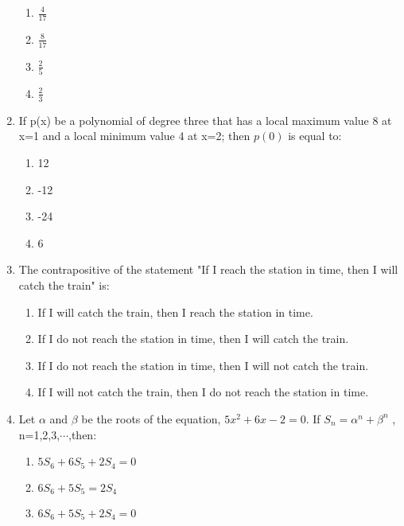 \documentclass[journal]{IEEEtran}
\numberwithin{equation}{enumi}
\numberwithin{figure}{enumi}
\begin{document}
\begin{enumerate}
    \begin{multicols}{4}
    \begin{enumerate}
        \item $\frac{4}{17}$
        \item $\frac{8}{17}$
        \item $\frac{2}{5}$
        \item $\frac{2}{3}$
    \end{enumerate} 
    \end{multicols}
    \item If p(x) be a polynomial of degree three that has a local maximum value 8 at x=1 and a local minimum value 4 at x=2; then $p(0)$ is equal to: \\
    \begin{multicols}{4}
    \begin{enumerate}
        \item 12
        \item -12
        \item -24
        \item 6
    \end{enumerate} 
    \end{multicols}
    \item The contrapositive of the statement "If I reach the station in time, then I will catch the train" is: \\
    \begin{enumerate}
        \item If I will catch the train, then I reach the station in time.
        \item If I do not reach the station in time, then I will catch the train.
        \item If I do not reach the station in time, then I will not catch the train.
        \item If I will not catch the train, then I do not reach the station in time.
    \end{enumerate} 
    \item Let $\alpha$ and $\beta$ be the roots of the equation, $5x^2+6x-2=0$. If $S_n = \alpha^n + \beta^n$ , n=1,2,3,$\cdots$,then: \\
    \begin{multicols}{2}
    \begin{enumerate}
        \item $5S_6+6S_5+2S_4=0$
        \item $6S_6+5S_5=2S_4$
        \item $6S_6+5S_5+2S_4=0$

\end{enumerate}
\end{multicols}
\end{enumerate}
\end{document}

